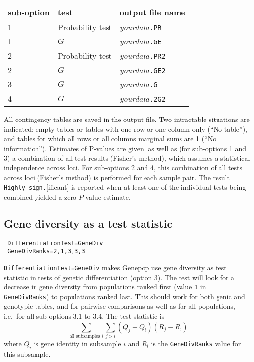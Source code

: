 \documentclass[12pt,]{book}
\theoremstyle{definition}
\theoremstyle{definition}
\theoremstyle{definition}
\theoremstyle{remark}
\begin{document}
\begin{longtable}[]{@{}lll@{}}
\toprule
sub-option & test & output file name\tabularnewline
\midrule
\endhead
1 & Probability test & \emph{yourdata}\texttt{.PR}\tabularnewline
1 & \(G\) & \emph{yourdata}\texttt{.GE}\tabularnewline
2 & Probability test & \emph{yourdata}\texttt{.PR2}\tabularnewline
2 & \(G\) & \emph{yourdata}\texttt{.GE2}\tabularnewline
3 & \(G\) & \emph{yourdata}\texttt{.G}\tabularnewline
4 & \(G\) & \emph{yourdata}\texttt{.2G2}\tabularnewline
\bottomrule
\end{longtable}

All contingency tables are saved in the output file. Two intractable
situations are indicated: empty tables or tables with one row or one
column only (``No table''), and tables for which all rows or all columns
marginal sums are 1 (``No information''). Estimates of P-values are
given, as well as (for sub-options 1 and 3) a combination of all test
results (Fisher's method), which assumes a statistical independence
across loci. For sub-options 2 and 4, this combination of all tests
across loci (Fisher's method) is performed for each sample pair. The
result \texttt{Highly\ sign.}{[}ificant{]} is reported when at least one
of the individual tests being combined yielded a zero \(P\)-value
estimate.

\subsection{Gene diversity as a test
statistic}\label{gene-diversity-as-a-test-statistic}


\begin{verbatim}
 DifferentiationTest=GeneDiv
 GeneDivRanks=2,1,3,3,3
\end{verbatim}

 
\texttt{DifferentiationTest=GeneDiv} makes Genepop use gene diversity as
test statistic in tests of genetic differentiation (option 3). The test
will look for a decrease in gene diversity from populations ranked first
(value \texttt{1} in \texttt{GeneDivRanks}) to populations ranked last.
This should work for both genic and genotypic tables, and for pairwise
comparisons as well as for all populations, i.e.~for all sub-options 3.1
to 3.4. The test statistic is
\[\sum_{\textrm{all subsamples $i$}}\sum_{j>i} (Q_j-Q_i)(R_j-R_i)\]
where \(Q_i\) is gene identity in subsample \(i\) and \(R_i\) is the
\texttt{GeneDivRanks} value for this subsample.
\end{document}

